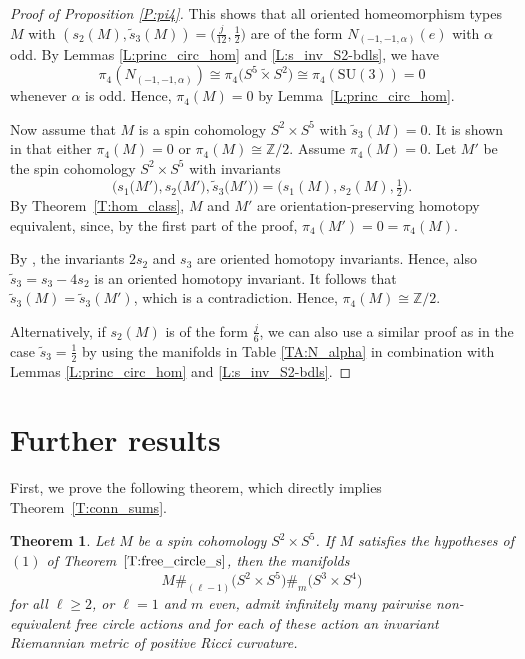 \documentclass[10pt,a4paper]{amsart}
\numberwithin{equation}{section}
\newtheorem{Theorem}{Theorem}[section]
\theoremstyle{definition}
\numberwithin{table}{section}
\newcommand{\Z}{\mathbb{Z}}
\newcommand{\ttimes}{\mathrel{\widetilde{\times} }}
\begin{document}
\begin{proof}[Proof of Proposition \ref{P:pi4}]
	
	
	This shows that all oriented homeomorphism types $M$ with $(s_2(M),\tilde{s}_3(M))=\bigl(\frac{j}{12},\frac{1}{2}\bigr)$ are of the form $N_{(-1,-1,\alpha)}(e)$ with $\alpha$ odd. By Lemmas \ref{L:princ_circ_hom} and \ref{L:s_inv_S2-bdls}, we have \[\pi_4(N_{(-1,-1,\alpha)})\cong \pi_4\bigl(S^5\ttimes S^2\bigr)\cong \pi_4(\mathrm{SU}(3))=0\] whenever $\alpha$ is odd. Hence, $\pi_4(M)=0$ by Lemma~\ref{L:princ_circ_hom}.
	
	Now assume that $M$ is a spin cohomology $S^2\times S^5$ with $\tilde{s}_3(M)=0$. It is shown in \cite[p. 471]{Kr98} that either $\pi_4(M)=0$ or $\pi_4(M)\cong\Z/2$. Assume $\pi_4(M)=0$. Let $M'$ be the spin cohomology $S^2\times S^5$ with invariants
	\[ \big(s_1\big(M'\big),s_2\big(M'\big),\tilde{s}_3\big(M'\big)\big)=\bigl(s_1(M),s_2(M),\tfrac{1}{2}\bigr). \]
	By Theorem~\ref{T:hom_class}, $M$ and $M'$ are orientation-preserving homotopy equivalent, since, by the first part of the proof, $\pi_4(M')=0=\pi_4(M)$.
	
	By \cite[Corollary 4.3]{EM16}, the invariants $2s_2$ and $s_3$ are oriented homotopy invariants. Hence, also $\tilde{s}_3=s_3-4s_2$ is an oriented homotopy invariant. It follows that $\tilde{s}_3(M)=\tilde{s}_3(M')$, which is a contradiction. Hence, $\pi_4(M)\cong\Z/2$.
	
	Alternatively, if $s_2(M)$ is of the form $\frac{j}{6}$, we can also use a similar proof as in the case $\tilde{s}_3=\frac{1}{2}$ by using the manifolds in Table \ref{TA:N_alpha} in combination with Lemmas \ref{L:princ_circ_hom} and \ref{L:s_inv_S2-bdls}.
\end{proof}

\section{Further results}\label{S:further}

First, we prove the following theorem, which directly implies Theorem~\ref{T:conn_sums}.
\begin{Theorem}\label{T:conn_sums_s}
	Let $M$ be a spin cohomology $S^2\times S^5$. If $M$ satisfies the hypotheses of $(1)$ of Theorem~$\ref{T:free_circle_s}$, then the manifolds
	\[ M\#_{(\ell-1)}\bigl(S^2\times S^5\bigr)\#_m\bigl(S^3\times S^4\bigr) \]
	for all $\ell\geq 2$, or $\ell=1$ and $m$ even, admit infinitely many pairwise non-equivalent free circle actions and for each of these action an invariant Riemannian metric of positive Ricci curvature.
\end{Theorem}
\end{document}
